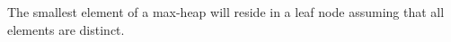 The smallest element of a max-heap will reside in a leaf node assuming that all elements are distinct.
